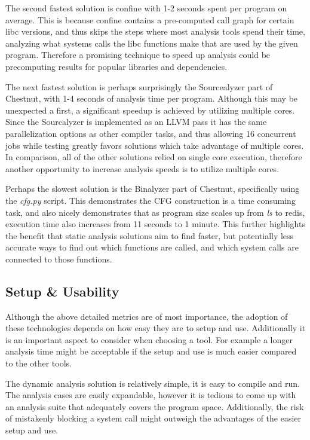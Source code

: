 The second fastest solution is confine with 1-2 seconds spent per program on average. This is because confine contains a pre-computed call graph for certain libc versions, and thus skips the steps where most analysis tools spend their time, analyzing what systems calls the libc functions make that are used by the given program. Therefore a promising technique to speed up analysis could be precomputing results for popular libraries and dependencies.

The next fastest solution is perhaps surprisingly the Sourcealyzer part of Chestnut, with 1-4 seconds of analysis time per program. Although this may be unexpected a first, a significant speedup is achieved by utilizing multiple cores. Since the Sourcalyzer is implemented as an LLVM pass it has the same parallelization options as other compiler tasks, and thus allowing 16 concurrent jobs while testing greatly favors solutions which take advantage of multiple cores. In comparison, all of the other solutions relied on single core execution, therefore another opportunity to increase analysis speeds is to utilize multiple cores.

Perhaps the slowest solution is the Binalyzer part of Chestnut, specifically using the \textit{cfg.py} script.
This demonstrates the CFG construction is a time consuming task, and also nicely demonstrates that as program size scales up from \textit{ls} to redis, execution time also increases from 11 seconds to 1 minute. This further highlights the benefit that static analysis solutions aim to find faster, but potentially less accurate ways to find out which functions are called, and which system calls are connected to those functions.

\subsection {Setup \& Usability}
Although the above detailed metrics are of most importance, the adoption of these technologies depends on how easy they are to setup and use. Additionally it is an important aspect to consider when choosing a tool. For example a longer analysis time might be acceptable if the setup and use is much easier compared to the other tools.

The dynamic analysis solution is relatively simple, it is easy to compile and run. The analysis cases are easily expandable, however it is tedious to come up with an analysis suite that adequately covers the program space. Additionally, the risk of mistakenly blocking a system call might outweigh the advantages of the easier setup and use.

